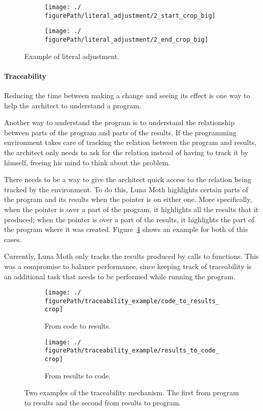 \begin{figure}
  \centering
  \begin{subfigure}[b]{0.49\linewidth}
    \texttt{[image: ./\\figurePath/literal\_adjustment/2\_start\_crop\_big]}
  \end{subfigure}%
\hspace{0.01\linewidth}%
  \begin{subfigure}[b]{0.49\linewidth}
    \texttt{[image: ./\\figurePath/literal\_adjustment/2\_end\_crop\_big]}
  \end{subfigure}
  \caption{Example of literal adjustment.}
  \label{fig:lit:adjust}
\end{figure}


\paragraph{Traceability}
Reducing the time between making a change and seeing its effect is one way to help the architect to understand a program.

Another way to understand the program is to understand the relationship between parts of the program and parts of the results.
If the programming environment takes care of tracking the relation between the program and results, the architect only needs to ask for the relation instead of having to track it by himself, freeing his mind to think about the problem.

There needs to be a way to give the architect quick access to the relation being tracked by the environment.
To do this, Luna Moth highlights certain parts of the program and its results when the pointer is on either one.
More specifically, when the pointer is over a part of the program, it highlights all the results that it produced;
when the pointer is over a part of the results, it highlights the part of the program where it was created.
Figure~\ref{fig:trace:example} shows an example for both of this cases.

Currently, Luna Moth only tracks the results produced by calls to functions.
This was a compromise to balance performance, since keeping track of traceability is an additional task that needs to be performed while running the program.

\begin{figure}
  \centering
  \begin{subfigure}[b]{1.0\linewidth}
    \texttt{[image: ./\\figurePath/traceability\_example/code\_to\_results\_crop]}
    \caption{From code to results.}
    \label{sub:code:to:results}
  \end{subfigure}

  \begin{subfigure}[b]{1.0\linewidth}
    \texttt{[image: ./\\figurePath/traceability\_example/results\_to\_code\_crop]}
    \caption{From results to code.}
    \label{sub:results:to:code}
  \end{subfigure}
  \caption{Two examples of the traceability mechanism. The first from program to results and the second from results to program.}
  \label{fig:trace:example}
\end{figure}


